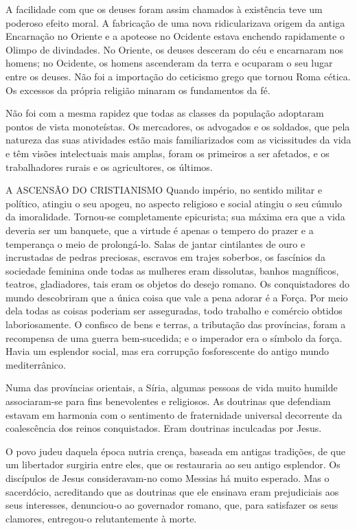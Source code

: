 \documentclass[11pt,a5paper,twoside,openany]{book}
\begin{document}
A facilidade com que os deuses foram assim chamados à existência teve um poderoso efeito moral. A fabricação de uma nova ridicularizava origem da antiga Encarnação no Oriente e a apoteose no Ocidente estava enchendo rapidamente o Olimpo de divindades. No Oriente, os deuses desceram do céu e encarnaram nos homens; no Ocidente, os homens ascenderam da terra e ocuparam o seu lugar entre os deuses. Não foi a importação do ceticismo grego que tornou Roma cética. Os excessos da própria religião minaram os fundamentos da fé.

Não foi com a mesma rapidez que todas as classes da população adoptaram pontos de vista monoteístas. Os mercadores, os advogados e os soldados, que pela natureza das suas atividades estão mais familiarizados com as vicissitudes da vida e têm visões intelectuais mais amplas, foram os primeiros a ser afetados, e os trabalhadores rurais e os agricultores, os últimos.

A ASCENSÃO DO CRISTIANISMO Quando império, no sentido militar e político, atingiu o seu apogeu, no aspecto religioso e social atingiu o seu cúmulo da imoralidade. Tornou-se completamente epicurista; sua máxima era que a vida deveria ser um banquete, que a virtude é apenas o tempero do prazer e a temperança o meio de prolongá-lo. Salas de jantar cintilantes de ouro e incrustadas de pedras preciosas, escravos em trajes soberbos, os fascínios da sociedade feminina onde todas as mulheres eram dissolutas, banhos magníficos, teatros, gladiadores, tais eram os objetos do desejo romano. Os conquistadores do mundo descobriram que a única coisa que vale a pena adorar é a Força. Por meio dela todas as coisas poderiam ser asseguradas, todo trabalho e comércio obtidos laboriosamente. O confisco de bens e terras, a tributação das províncias, foram a recompensa de uma guerra bem-sucedida; e o imperador era o símbolo da força. Havia um esplendor social, mas era corrupção fosforescente do antigo mundo mediterrânico.

Numa das províncias orientais, a Síria, algumas pessoas de vida muito humilde associaram-se para fins benevolentes e religiosos. As doutrinas que defendiam estavam em harmonia com o sentimento de fraternidade universal decorrente da coalescência dos reinos conquistados. Eram doutrinas inculcadas por Jesus.

O povo judeu daquela época nutria crença, baseada em antigas tradições, de que um libertador surgiria entre eles, que os restauraria ao seu antigo esplendor. Os discípulos de Jesus consideravam-no como Messias há muito esperado. Mas o sacerdócio, acreditando que as doutrinas que ele ensinava eram prejudiciais aos seus interesses, denunciou-o ao governador romano, que, para satisfazer os seus clamores, entregou-o relutantemente à morte.
\end{document}
